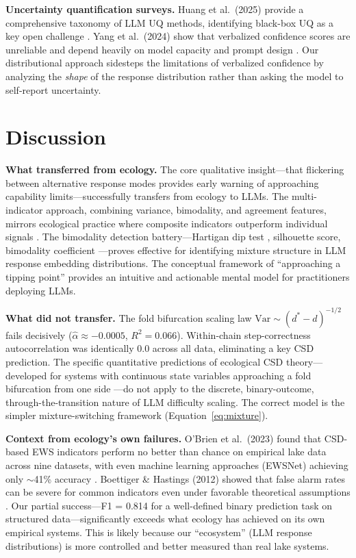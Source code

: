 \documentclass[11pt,letterpaper]{article}
\begin{document}
\textbf{Uncertainty quantification surveys.} Huang et al.~(2025) provide a comprehensive taxonomy of LLM UQ methods, identifying black-box UQ as a key open challenge \cite{huang2025survey}. Yang et al.~(2024) show that verbalized confidence scores are unreliable and depend heavily on model capacity and prompt design \cite{yang2024verbalized}. Our distributional approach sidesteps the limitations of verbalized confidence by analyzing the \emph{shape} of the response distribution rather than asking the model to self-report uncertainty.

\section{Discussion}
\label{sec:discussion}

\textbf{What transferred from ecology.} The core qualitative insight---that flickering between alternative response modes provides early warning of approaching capability limits---successfully transfers from ecology to LLMs. The multi-indicator approach, combining variance, bimodality, and agreement features, mirrors ecological practice where composite indicators outperform individual signals \cite{dakos2012methods, ghadami2022}. The bimodality detection battery---Hartigan dip test \cite{hartigan1985}, silhouette score, bimodality coefficient \cite{freeman2013, kang2019}---proves effective for identifying mixture structure in LLM response embedding distributions. The conceptual framework of ``approaching a tipping point'' provides an intuitive and actionable mental model for practitioners deploying LLMs.

\textbf{What did not transfer.} The fold bifurcation scaling law $\text{Var} \sim (d^* - d)^{-1/2}$ fails decisively ($\hat{\alpha} \approx -0.0005$, $R^2 = 0.066$). Within-chain step-correctness autocorrelation was identically 0.0 across all data, eliminating a key CSD prediction. The specific quantitative predictions of ecological CSD theory---developed for systems with continuous state variables approaching a fold bifurcation from one side \cite{kuehn2011}---do not apply to the discrete, binary-outcome, through-the-transition nature of LLM difficulty scaling. The correct model is the simpler mixture-switching framework (Equation~\ref{eq:mixture}).

\textbf{Context from ecology's own failures.} O'Brien et al.~(2023) found that CSD-based EWS indicators perform no better than chance on empirical lake data across nine datasets, with even machine learning approaches (EWSNet) achieving only $\sim$41\% accuracy \cite{obrien2023}. Boettiger \& Hastings (2012) showed that false alarm rates can be severe for common indicators even under favorable theoretical assumptions \cite{boettiger2012}. Our partial success---F1 = 0.814 for a well-defined binary prediction task on structured data---significantly exceeds what ecology has achieved on its own empirical systems. This is likely because our ``ecosystem'' (LLM response distributions) is more controlled and better measured than real lake systems.
\end{document}
